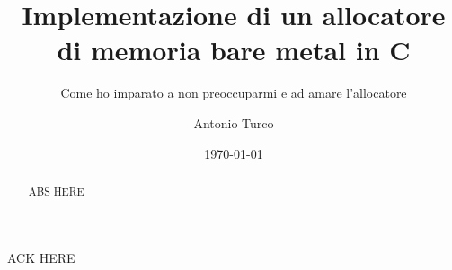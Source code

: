 \documentclass[noexaminfo,oneside]{sapthesis}
\title{Implementazione di un allocatore di memoria bare metal in C}
\subtitle{Come ho imparato a non preoccuparmi e ad amare l'allocatore}
\author{Antonio Turco}
\date{\today}
\begin{document}
\frontmatter  
\maketitle
\dedication{Dedicato a chi rimane curioso per tutta la vita}

\begin{abstract}
  ABS HERE
\end{abstract}


\mainmatter 
\tableofcontents













\backmatter

\begin{acknowledgments}
  ACK HERE 
\end{acknowledgments}
\end{document}
